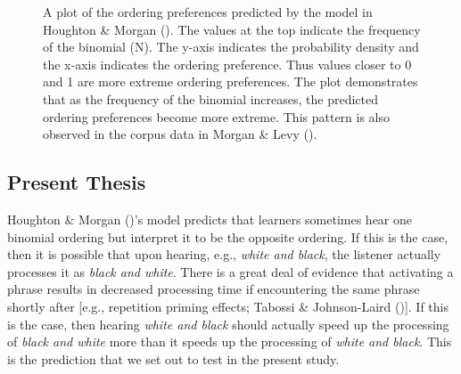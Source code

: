 \documentclass[
  12pt,
]{scrartcl}
\begin{document}
\begin{figure}[htbp]

\caption{\label{fig-corpusourmodel}A plot of the ordering preferences
predicted by the model in Houghton \& Morgan
().
The values at the top indicate the frequency of the binomial (N). The
y-axis indicates the probability density and the x-axis indicates the
ordering preference. Thus values closer to 0 and 1 are more extreme
ordering preferences. The plot demonstrates that as the frequency of the
binomial increases, the predicted ordering preferences become more
extreme. This pattern is also observed in the corpus data in Morgan \&
Levy ().}


\end{figure}%

\subsection{Present Thesis}\label{present-thesis}

Houghton \& Morgan
()'s
model predicts that learners sometimes hear one binomial ordering but
interpret it to be the opposite ordering. If this is the case, then it
is possible that upon hearing, e.g., \emph{white and black}, the
listener actually processes it as \emph{black and white}. There is a
great deal of evidence that activating a phrase results in decreased
processing time if encountering the same phrase shortly after {[}e.g.,
repetition priming effects; Tabossi \& Johnson-Laird
(){]}. If this
is the case, then hearing \emph{white and black} should actually speed
up the processing of \emph{black and white} more than it speeds up the
processing of \emph{white and black}. This is the prediction that we set
out to test in the present study.
\end{document}
